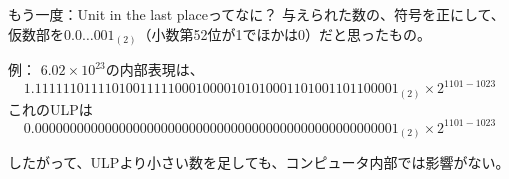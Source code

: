 \documentclass[unicode,lualatex,aspectratio=169]{beamer}
\begin{document}
\begin{frame}[fragile]{もう一度：Unit in the last placeってなに？}
  与えられた数の、符号を正にして、仮数部を$0.0\dots 001_{(2)}$（小数第52位が1でほかは0）だと思ったもの。

  
  例：
  $6.02\times 10^{23}$の内部表現は、
  {\tiny \[\mathtt{1.1111110111101001111100010000101010001101001101100001}_{(2)} \times 2^{1101-1023}\]}
  これのULPは
  {\tiny \[\mathtt{0.0000000000000000000000000000000000000000000000000001}_{(2)} \times 2^{1101-1023}\]}

  したがって、ULPより小さい数を足しても、コンピュータ内部では影響がない。
\end{frame}
\end{document}
